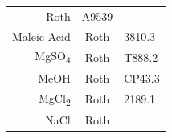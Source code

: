 \documentclass[11pt,singlespacinge,twoside]{reedthesis} %
\theoremstyle{definition}
\theoremstyle{definition}
\theoremstyle{definition}
\theoremstyle{remark}
\begin{document}
\begin{longtable}[]{@{}rcl@{}}
\begin{minipage}[t]{0.33\columnwidth}
Roth\strut
\end{minipage} & \begin{minipage}[t]{0.29\columnwidth}\raggedright
A9539\strut
\end{minipage}\tabularnewline
\begin{minipage}[t]{0.29\columnwidth}\raggedleft
Maleic Acid\strut
\end{minipage} & \begin{minipage}[t]{0.33\columnwidth}\centering
Roth\strut
\end{minipage} & \begin{minipage}[t]{0.29\columnwidth}\raggedright
3810.3\strut
\end{minipage}\tabularnewline
\begin{minipage}[t]{0.29\columnwidth}\raggedleft
MgSO\textsubscript{4}\strut
\end{minipage} & \begin{minipage}[t]{0.33\columnwidth}\centering
Roth\strut
\end{minipage} & \begin{minipage}[t]{0.29\columnwidth}\raggedright
T888.2\strut
\end{minipage}\tabularnewline
\begin{minipage}[t]{0.29\columnwidth}\raggedleft
MeOH\strut
\end{minipage} & \begin{minipage}[t]{0.33\columnwidth}\centering
Roth\strut
\end{minipage} & \begin{minipage}[t]{0.29\columnwidth}\raggedright
CP43.3\strut
\end{minipage}\tabularnewline
\begin{minipage}[t]{0.29\columnwidth}\raggedleft
MgCl\textsubscript{2}\strut
\end{minipage} & \begin{minipage}[t]{0.33\columnwidth}\centering
Roth\strut
\end{minipage} & \begin{minipage}[t]{0.29\columnwidth}\raggedright
2189.1\strut
\end{minipage}\tabularnewline
\begin{minipage}[t]{0.29\columnwidth}\raggedleft
NaCl\strut
\end{minipage} & \begin{minipage}[t]{0.33\columnwidth}\centering
Roth\strut
\end{minipage} & \begin{minipage}[t]{0.29\columnwidth}\raggedright

\end{minipage}
\end{longtable}
\end{document}
